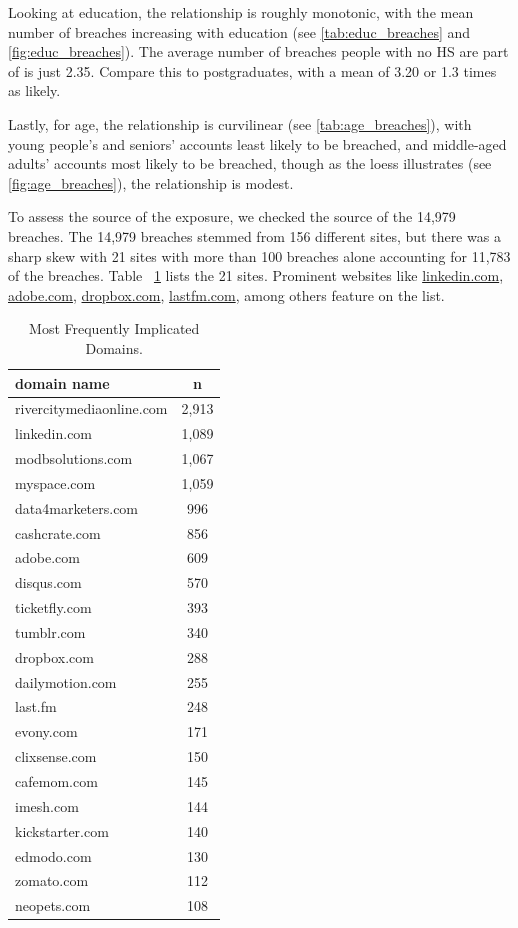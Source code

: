 \documentclass[12pt, letterpaper]{article}
\begin{document}


Looking at education, the relationship is roughly monotonic, with the mean number of breaches increasing with education (see \ref{tab:educ_breaches} and \ref{fig:educ_breaches}). The average number of breaches people with no HS are part of is just 2.35. Compare this to postgraduates, with a mean of 3.20 or 1.3 times as likely.

Lastly, for age, the relationship is curvilinear (see \ref{tab:age_breaches}), with young people's and seniors' accounts least likely to be breached, and middle-aged adults' accounts most likely to be breached, though as the loess illustrates (see \ref{fig:age_breaches}), the relationship is modest.

To assess the source of the exposure, we checked the source of the 14,979 breaches. The 14,979 breaches stemmed from 156 different sites, but there was a sharp skew with 21 sites with more than 100 breaches alone accounting for 11,783 of the breaches. Table ~\ref{table:domain_dat} lists the 21 sites. Prominent websites like \url{linkedin.com}, \url{adobe.com}, \url{dropbox.com}, \url{lastfm.com}, among others feature on the list. 

\begin{table}[h!]
\centering
\caption{Most Frequently Implicated Domains.}
\begin{tabular}{ l c }
\hline    
domain name & n \\
\hline
rivercitymediaonline.com &   2,913 \\
linkedin.com             &   1,089 \\
modbsolutions.com        &   1,067\\
myspace.com              &   1,059\\
data4marketers.com       &    996\\
cashcrate.com            &    856\\
adobe.com                &    609\\
disqus.com               &    570\\
ticketfly.com            &    393\\
tumblr.com               &    340\\
dropbox.com              &    288\\
dailymotion.com          &    255\\
last.fm                  &    248\\
evony.com                &    171\\
clixsense.com            &    150\\
cafemom.com              &    145\\
imesh.com                &    144\\
kickstarter.com          &    140\\
edmodo.com               &    130\\
zomato.com               &    112\\
neopets.com              &    108\\
\hline
\end{tabular}
\label{table:domain_dat}
\end{table}
\end{document}
